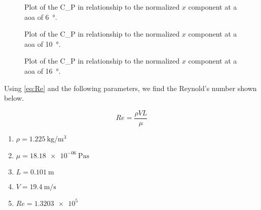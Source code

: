 \begin{figure}[htpb]
    \centering
    
    \caption[Plot of the Coefficient of pressure in relationship to the normalized x component at a Angle of attack of 6 degrees]{Plot of the \gls{C_P} in relationship to the normalized $x$ component at a \acrshort{aoa} of \qty{6}{\degree}.}
    \label{fig:C_P vs. 6° Angle of Attack.svg}
\end{figure}

\begin{figure}[htpb]
    \centering
    
    \caption[Plot of the Coefficient of pressure in relationship to the normalized x component at a Angle of attack of 10 degrees]{Plot of the \gls{C_P} in relationship to the normalized $x$ component at a \acrshort{aoa} of \qty{10}{\degree}.}
    \label{fig:C_P vs. 10° Angle of Attack.svg}
\end{figure}

\begin{figure}[htpb]
    \centering
    
    \caption[Plot of the Coefficient of pressure in relationship to the normalized x component at a Angle of attack of 16 degrees]{Plot of the \gls{C_P} in relationship to the normalized $x$ component at a \acrshort{aoa} of \qty{16}{\degree}.}
    \label{fig:C_P vs. 16° Angle of Attack.svg}
\end{figure}

\newpage

Using \autoref{eq:Re} and the following parameters, we find the Reynold's number shown below.

\begin{equation}\label{eq:Re}
    Re = \frac{\rho V L}{\mu}
\end{equation}

\begin{enumerate}
    \item[] $\rho = \qty{1.225}{\kilogram\per\meter^3}$
    \item[] $\mu = \qty{18.18e-06}{\pascal\second}$
    \item[] $L = \qty{0.101}{\meter}$
    \item[] $V = \qty{19.4}{\meter\per\second}$
    \item[] $Re = \num{1.3203e5}$
\end{enumerate}
